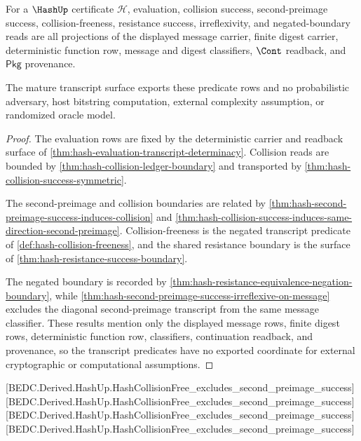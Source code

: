 \begin{theorem}
\label{thm:hash-transcript-predicate-mature-coverage}
For a $\HashUp$ certificate $\mathcal H$, evaluation, collision success,
second-preimage success, collision-freeness, resistance success, irreflexivity,
and negated-boundary reads are all projections of the displayed message carrier,
finite digest carrier, deterministic function row, message and digest
classifiers, $\Cont$ readback, and $\mathsf{Pkg}$ provenance.

The mature transcript surface exports these predicate rows and no probabilistic
adversary, host bitstring computation, external complexity assumption, or
randomized oracle model.
\end{theorem}
\begin{proof}
The evaluation rows are fixed by the deterministic carrier and readback surface
of \autoref{thm:hash-evaluation-transcript-determinacy}. Collision reads are
bounded by \autoref{thm:hash-collision-ledger-boundary} and transported by
\autoref{thm:hash-collision-success-symmetric}.

The second-preimage and collision boundaries are related by
\autoref{thm:hash-second-preimage-success-induces-collision} and
\autoref{thm:hash-collision-success-induces-same-direction-second-preimage}.
Collision-freeness is the negated transcript predicate of
\autoref{def:hash-collision-freeness}, and the shared resistance boundary is
the surface of \autoref{thm:hash-resistance-success-boundary}.

The negated boundary is recorded by
\autoref{thm:hash-resistance-equivalence-negation-boundary}, while
\autoref{thm:hash-second-preimage-success-irreflexive-on-message} excludes the
diagonal second-preimage transcript from the same message classifier. These
results mention only the displayed message rows, finite digest rows,
deterministic function row, classifiers, continuation readback, and provenance,
so the transcript predicates have no exported coordinate for external
cryptographic or computational assumptions.
\end{proof}

[BEDC.Derived.HashUp.HashCollisionFree\_excludes\_second\_preimage\_success]
[BEDC.Derived.HashUp.HashCollisionFree\_excludes\_second\_preimage\_success]
[BEDC.Derived.HashUp.HashCollisionFree\_excludes\_second\_preimage\_success]
[BEDC.Derived.HashUp.HashCollisionFree\_excludes\_second\_preimage\_success]

